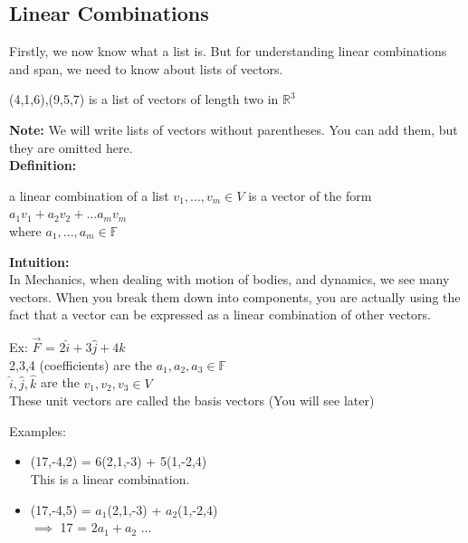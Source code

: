 \documentclass{article}
\begin{document}
\subsection{Linear Combinations}
Firstly, we now know what a list is. But for understanding linear combinations and span, we need to know about lists of vectors. 
\begin{center}
    (4,1,6),(9,5,7) is a list of vectors of length two in $\mathbb{R}^3$
\end{center}
\textbf{Note:} We will write lists of vectors without parentheses. You can add them, but they are omitted here. \\
\textbf{Definition:} 
\begin{center}
    a linear combination of a list $v_1,...,v_m \in V$ is a vector of the form \\
        $a_1v_1 + a_2v_2 + ... a_mv_m$ \\
    where $a_1,...,a_m \in \mathbb{F}$
\end{center}
\textbf{Intuition:} \\
In Mechanics, when dealing with motion of bodies, and dynamics, we see many vectors. When you break them down into components, you are actually using the fact that a vector can be expressed as a linear combination of other vectors. 
\begin{center}
    Ex: $\vec{F}$ = $2\hat{i} + 3\hat{j} + 4 \hat{k}$ \\
    2,3,4 (coefficients) are the $a_1,a_2,a_3 \in \mathbb{F}$ \\
    $\hat{i}, \hat{j}, \hat{k}$ are the $v_1,v_2,v_3 \in V$ \\
    These unit vectors are called the basis vectors (You will see later)
\end{center}
Examples: 
\begin{itemize}
    \item (17,-4,2) = 6(2,1,-3) + 5(1,-2,4)\\
    This is a linear combination.
    \item (17,-4,5) = $a_1$(2,1,-3) + $a_2$(1,-2,4) \\
    $\implies$ 17 = $2a_1 + a_2$ ...
\end{itemize}
\end{document}
